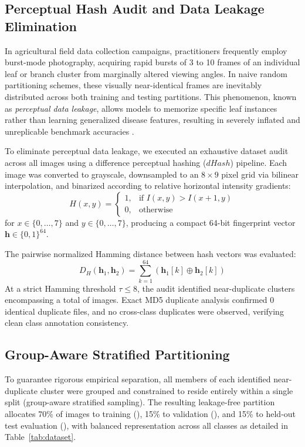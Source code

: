 \subsection{Perceptual Hash Audit and Data Leakage Elimination}
In agricultural field data collection campaigns, practitioners frequently employ burst-mode photography, acquiring rapid bursts of 3 to 10 frames of an individual leaf or branch cluster from marginally altered viewing angles. In naive random partitioning schemes, these visually near-identical frames are inevitably distributed across both training and testing partitions. This phenomenon, known as \textit{perceptual data leakage}, allows models to memorize specific leaf instances rather than learning generalized disease features, resulting in severely inflated and unreplicable benchmark accuracies \cite{barbedo2019plant}.

To eliminate perceptual data leakage, we executed an exhaustive dataset audit across all \totalImages{} images using a difference perceptual hashing ($dHash$) pipeline. Each image was converted to grayscale, downsampled to an $8 \times 9$ pixel grid via bilinear interpolation, and binarized according to relative horizontal intensity gradients:
\begin{equation}
    H(x, y) = \begin{cases} 1, & \text{if } I(x, y) > I(x+1, y) \\ 0, & \text{otherwise} \end{cases}
\end{equation}
for $x \in \{0, \dots, 7\}$ and $y \in \{0, \dots, 7\}$, producing a compact 64-bit fingerprint vector $\mathbf{h} \in \{0, 1\}^{64}$.

The pairwise normalized Hamming distance between hash vectors was evaluated:
\begin{equation}
    D_H(\mathbf{h}_1, \mathbf{h}_2) = \sum_{k=1}^{64} (\mathbf{h}_1[k] \oplus \mathbf{h}_2[k])
\end{equation}
At a strict Hamming threshold $\tau \le 8$, the audit identified \nearDupGroups{} near-duplicate clusters encompassing a total of \nearDupImages{} images. Exact MD5 duplicate analysis confirmed 0 identical duplicate files, and no cross-class duplicates were observed, verifying clean class annotation consistency.

\subsection{Group-Aware Stratified Partitioning}
To guarantee rigorous empirical separation, all members of each identified near-duplicate cluster were grouped and constrained to reside entirely within a single split (group-aware stratified sampling). The resulting leakage-free partition allocates 70\% of images to training (\trainCount{}), 15\% to validation (\valCount{}), and 15\% to held-out test evaluation (\testCount{}), with balanced representation across all \numClasses{} classes as detailed in Table~\ref{tab:dataset}.

